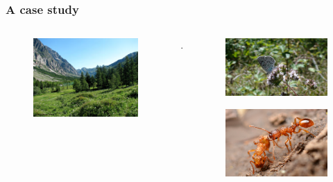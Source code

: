 \documentclass[10pt]{beamer}
\begin{document}
\begin{frame}
\frametitle{A case study}

\begin{columns}

\begin{figure}
\includegraphics[width=0.9\linewidth]{pictures/studyarea}
\end{figure}
\vspace{2.5cm}
.

\begin{center}
\begin{figure}
\includegraphics[width=.85\linewidth]{pictures/Maculineaarion}
\end{figure}


\begin{figure}
\includegraphics[width=.85\linewidth]{pictures/Myrmica}
\end{figure}
\end{center}


\end{columns}
\end{frame}
\end{document}
